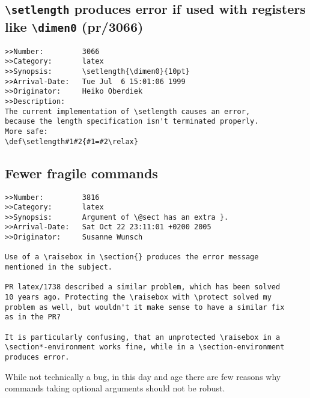 \documentclass{ltxguide}
\begin{document}
\subsection{\texttt{\textbackslash setlength} produces error if
  used with registers like \texttt{\textbackslash dimen0} (pr/3066)}

\begin{verbatim}
>>Number:         3066
>>Category:       latex
>>Synopsis:       \setlength{\dimen0}{10pt}
>>Arrival-Date:   Tue Jul  6 15:01:06 1999
>>Originator:     Heiko Oberdiek
>>Description:
The current implementation of \setlength causes an error,
because the length specification isn't terminated properly.
More safe:
\def\setlength#1#2{#1=#2\relax}
\end{verbatim}

\subsection{Fewer fragile commands}

\begin{verbatim}
>>Number:         3816
>>Category:       latex
>>Synopsis:       Argument of \@sect has an extra }.
>>Arrival-Date:   Sat Oct 22 23:11:01 +0200 2005
>>Originator:     Susanne Wunsch

Use of a \raisebox in \section{} produces the error message
mentioned in the subject.

PR latex/1738 described a similar problem, which has been solved
10 years ago. Protecting the \raisebox with \protect solved my
problem as well, but wouldn't it make sense to have a similar fix
as in the PR?

It is particularly confusing, that an unprotected \raisebox in a
\section*-environment works fine, while in a \section-environment
produces error.
\end{verbatim}

While not technically a bug, in this day and age there are few
reasons why commands taking optional arguments should not be robust.
\end{document}
